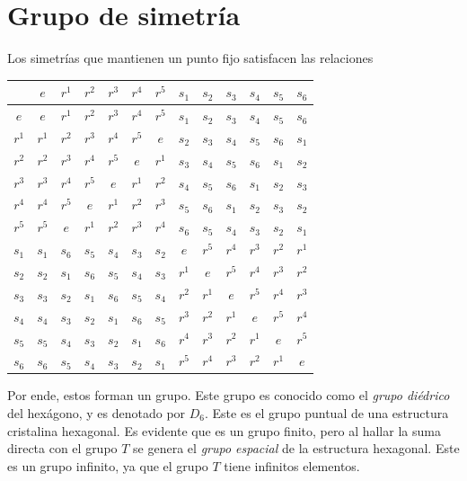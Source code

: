 \section{Grupo de simetría}
Los simetrías que mantienen un punto fijo satisfacen las relaciones
\begin{table}[!httb]
  \centering
  \begin{tabular}{|c | c c c c c c c c c c c c|}
    \hline
   & $e$ & $r^1$ & $r^2$ & $r^3$ & $r^4$ & $r^5$ & $s_1$ & $s_2$ & $s_3$ & $s_4$ & $s_5$ & $s_6$\\\hline
  $e$ & $e$ & $r^1$ & $r^2$ & $r^3$ & $r^4$ & $r^5$ & $s_1$ & $s_2$ & $s_3$ & $s_4$ & $s_5$ & $s_6$\\
  $r^1$ & $r^1$ & $r^2$ & $r^3$ & $r^4$ & $r^5$ & $e$ & $s_2$ & $s_3$ & $s_4$ & $s_5$ & $s_6$ & $s_1$\\
  $r^2$ & $r^2$ & $r^3$ & $r^4$ & $r^5$ & $e$ & $r^1$ & $s_3$ & $s_4$ & $s_5$ & $s_6$ & $s_1$ & $s_2$\\
  $r^3$ & $r^3$ & $r^4$ & $r^5$ & $e$ & $r^1$ & $r^2$ & $s_4$ & $s_5$ & $s_6$ & $s_1$ & $s_2$ & $s_3$\\
  $r^4$ & $r^4$ & $r^5$ & $e$ & $r^1$ & $r^2$ & $r^3$ & $s_5$ & $s_6$ & $s_1$ & $s_2$ & $s_3$ & $s_2$\\
  $r^5$ & $r^5$ & $e$ & $r^1$ & $r^2$ & $r^3$ & $r^4$ & $s_6$ & $s_5$ & $s_4$ & $s_3$ & $s_2$ & $s_1$\\
  $s_1$ & $s_1$ & $s_6$ & $s_5$ & $s_4$ & $s_3$ & $s_2$ & $e$ & $r^5$ & $r^4$ & $r^3$ & $r^2$ & $r^1$\\
  $s_2$ & $s_2$ & $s_1$ & $s_6$ & $s_5$ & $s_4$ & $s_3$ & $r^1$ & $e$ & $r^5$ & $r^4$ & $r^3$ & $r^2$\\
  $s_3$ & $s_3$ & $s_2$ & $s_1$ & $s_6$ & $s_5$ & $s_4$ & $r^2$ & $r^1$ & $e$ & $r^5$ & $r^4$ & $r^3$\\
  $s_4$ & $s_4$ & $s_3$ & $s_2$ & $s_1$ & $s_6$ & $s_5$ & $r^3$ & $r^2$ & $r^1$ & $e$ & $r^5$ & $r^4$\\
  $s_5$ & $s_5$ & $s_4$ & $s_3$ & $s_2$ & $s_1$ & $s_6$ & $r^4$ & $r^3$ & $r^2$ & $r^1$ & $e$ & $r^5$\\
  $s_6$ & $s_6$ & $s_5$ & $s_4$ & $s_3$ & $s_2$ & $s_1$ & $r^5$ & $r^4$ & $r^3$ & $r^2$ & $r^1$ & $e$\\\hline
  \end{tabular}
\end{table}

Por ende, estos forman un grupo. Este grupo es conocido como el \emph{grupo diédrico} del hexágono, y es denotado por $D_6$. Este es el grupo puntual de una estructura cristalina hexagonal. Es evidente que es un grupo finito, pero al hallar la suma directa con el grupo $T$ se genera el \emph{grupo espacial} de la estructura hexagonal. Este es un grupo infinito, ya que el grupo $T$ tiene infinitos elementos.
